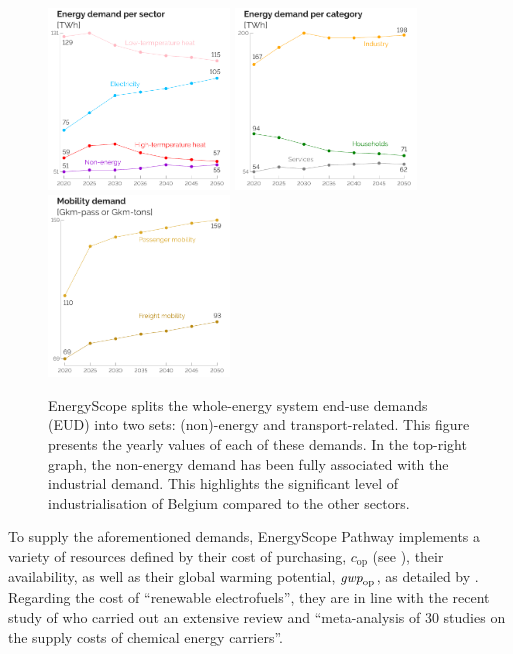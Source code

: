 \documentclass[11pt,twoside,a4paper,english]{article}
\begin{document}
\begin{appendices}
\begin{figure}[htbp!]
\centering
\includegraphics[width=0.43\textwidth]{EUD_sec.pdf}
\includegraphics[width=0.43\textwidth]{EUD_cat.pdf}
\includegraphics[width=0.43\textwidth]{EUD_mob.pdf}
\caption{EnergyScope splits the whole-energy system end-use demands (EUD) into two sets: (non)-energy and transport-related. This figure presents the yearly values of each of these demands. In the top-right graph, the non-energy demand has been fully associated with the industrial demand. This highlights the significant level of industrialisation of Belgium compared to the other sectors.}
\label{fig:cs_demands}
\end{figure}

To supply the aforementioned demands, EnergyScope Pathway implements a variety of resources defined by their cost of purchasing, $\mathit{c}_{\mathrm{op}}$ (see ), their availability, as well as their global warming potential, $\emph{gwp}_{\mathrm{op}}$, as detailed by \citet{limpens2024pathway}. Regarding the cost of ``renewable electrofuels'', they are in line with the recent study of \citet{genge2023supply} who carried out an extensive review and ``meta-analysis \cite{grant2009typology,page2021prisma} of 30 studies on the supply costs of chemical energy carriers''. 


\end{appendices}
\end{document}
